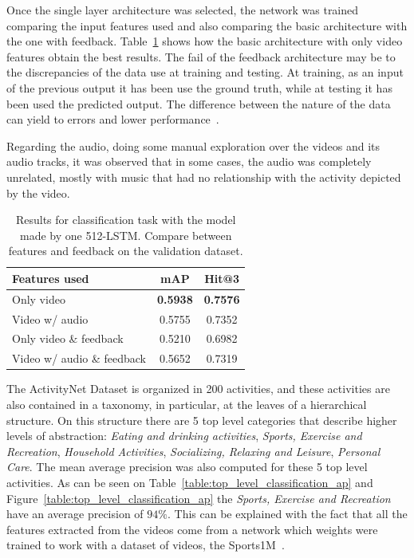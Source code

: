 Once the single layer architecture was selected, the network was trained comparing the input features used and also comparing the basic architecture with the one with feedback.  Table~\ref{table:classification_by_features} shows how the basic architecture  with only video features obtain the best results.
The fail of the feedback architecture may be to the discrepancies of the data use at training and testing. At training, as an input of the previous output it has been use the ground truth, while at testing it has been used the predicted output. The difference between the nature of the data can yield to errors and lower performance~\cite{bengio2015scheduled}.

Regarding the audio, doing some manual exploration over the videos and its audio tracks, it was observed that in some cases, the audio was completely unrelated, mostly with music that had no relationship with the activity depicted by the video.

\begin{table}[H]
\begin{center}
\begin{tabular}{|l|c|c|}
\hline
Features used & mAP & Hit@3 \\
\hline\hline
Only video & \bf0.5938 & \bf0.7576 \\
Video w/ audio & 0.5755 & 0.7352 \\
Only video \& feedback & 0.5210 & 0.6982 \\
Video w/ audio \& feedback & 0.5652 & 0.7319 \\
\hline
\end{tabular}
\end{center}
\caption{Results for classification task with the model made by one 512-LSTM. Compare between
         features and feedback on the validation dataset.}
\label{table:classification_by_features}
\end{table}

The ActivityNet Dataset is organized in 200 activities, and these activities are also contained in a taxonomy, in particular, at the leaves of a hierarchical structure.
On this structure there are 5 top level categories that describe higher levels of abstraction: \textit{Eating and drinking activities}, \textit{Sports, Exercise and Recreation}, \textit{Household Activities}, \textit{Socializing, Relaxing and Leisure}, \textit{Personal Care}.
The mean average precision was also computed for these 5 top level activities.
As can be seen on Table~\ref{table:top_level_classification_ap} and Figure~\ref{table:top_level_classification_ap} the \textit{Sports, Exercise and Recreation} have an average precision of $94\%$. This can be explained with the fact that all the features extracted from the videos come from a network which weights were trained to work with a dataset of videos, the Sports1M~\cite{KarpathyCVPR14}.

